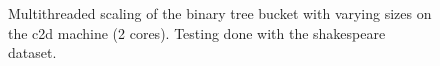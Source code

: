 \begin{landscape}
\begin{figure}[!h]
{        }
        \label{fig:ts_c2d_shake_btree}
        \caption{Multithreaded scaling of the binary tree bucket with varying sizes on the
        c2d machine (2 cores). Testing done with the shakespeare dataset.}
    \end{figure}
    \begin{figure}[!h]
\end{figure}
\end{landscape}
